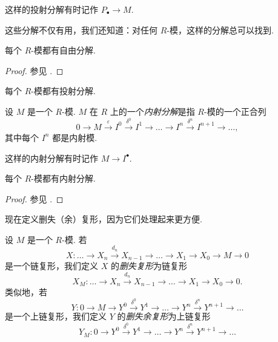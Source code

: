 \begin{notation}\label{c4-not-3-2}
这样的投射分解有时记作 $P_\bullet\to M$.
\end{notation}

这些分解不仅有用，我们还知道：对任何 $R$-模，这样的分解总可以找到.

\begin{theorem}\label{c4-thm-3-1}
每个 $R$-模都有自由分解.
\end{theorem}

\begin{proof}
参见 \cite[Proposition~6.2, \S6.1]{rot09}.
\end{proof}

\begin{corollary}\label{c4-cor-3-2}
每个 $R$-模都有投射分解.
\end{corollary}

\begin{definition}\label{c4-def-3-3}
设 $M$ 是一个 $R$-模. $M$ 在 $R$ 上的一个\emph{内射分解}是指 $R$-模的一个正合列
\[
0\to M\xrightarrow{\varepsilon}I^0\xrightarrow{\delta^0}I^1\to\ldots\to I^n\xrightarrow{\delta^n}I^{n+1}\to\ldots,
\]
其中每个 $I^n$ 都是内射模.
\end{definition}

\begin{notation}\label{c4-not-3-4}
这样的内射分解有时记作 $M\to I^\bullet$.
\end{notation}

\begin{theorem}\label{c4-thm-3-3}
每个 $R$-模都有内射分解.
\end{theorem}

\begin{proof}
参见 \cite[Proposition~6.4, \S6.1]{rot09}.
\end{proof}

现在定义删失（余）复形，因为它们处理起来更方便.

\begin{definition}\label{c4-def-3-5}
设 $M$ 是一个 $R$-模. 若
\[
X:\ldots\to X_n\xrightarrow{d_n}X_{n-1}\to\ldots\to X_1\to X_0\to M\to 0
\]
是一个链复形，我们定义 $X$ 的\emph{删失复形}为链复形
\[
X_M:\ldots\to X_n\xrightarrow{d_n}X_{n-1}\to\ldots\to X_1\to X_0\to 0.
\]
类似地，若
\[
Y:0\to M\to Y^0\xrightarrow{\delta^0}Y^1\to\ldots\to Y^n\xrightarrow{\delta^n}Y^{n+1}\to\ldots
\]
是一个上链复形，我们定义 $Y$ 的\emph{删失余复形}为上链复形
\[
Y_M:0\to Y^0\xrightarrow{\delta^0}Y^1\to\ldots\to Y^n\xrightarrow{\delta^n}Y^{n+1}\to\ldots
\]
\end{definition}


